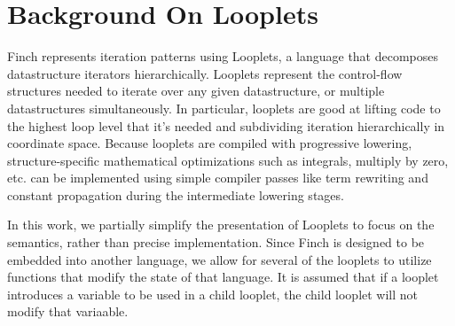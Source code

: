 \section{Background On Looplets}
Finch represents iteration patterns using Looplets, a language that decomposes
datastructure iterators hierarchically. Looplets represent the control-flow
structures needed to iterate over any given datastructure, or multiple
datastructures simultaneously. In particular, looplets are good at lifting code
to the highest loop level that it's needed and subdividing iteration
hierarchically in coordinate space. Because looplets are compiled with
progressive lowering, structure-specific mathematical optimizations such as
integrals, multiply by zero, etc. can be implemented using simple compiler
passes like term rewriting and constant propagation during the intermediate
lowering stages. \cite{ahrens_looplets_2023}

In this work, we partially simplify the presentation of Looplets to focus on the
semantics, rather than precise implementation. Since Finch is designed to be
embedded into another language, we allow for several of the looplets to utilize
functions that modify the state of that language. It is assumed that if a
looplet introduces a variable to be used in a child looplet, the child looplet
will not modify that variaable.

